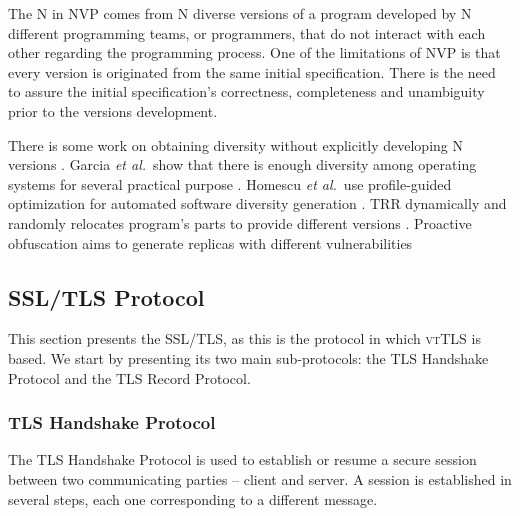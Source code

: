 \documentclass{sig-alternate-05-2015}
\begin{document}
The N in NVP comes from  N diverse versions of a program developed by N different programming teams, or programmers, that do not interact with each other regarding the programming process.
One of the limitations of NVP is that every version is originated from the same initial specification. There is the need to assure the initial specification's correctness, completeness and unambiguity prior to the versions development.

There is some work on obtaining diversity without explicitly  developing N versions \cite{larsen2014sok}. Garcia \emph{et al.}~show that there is enough diversity among operating systems for several practical purpose \cite{Garcia:11}. Homescu \emph{et al.}~use profile-guided optimization for automated software diversity generation \cite{homescu2013profile}. TRR dynamically and randomly relocates program's parts to provide different versions \cite{xu2003transparent}. Proactive obfuscation aims to generate replicas with different vulnerabilities \cite{Roeder:10}



\subsection{SSL/TLS Protocol}


This section presents the SSL/TLS, as this is the protocol in which \textsc{vtTLS} is based. We start by presenting its two main sub-protocols: the TLS Handshake Protocol and the TLS Record Protocol.

\subsubsection{TLS Handshake Protocol}

The TLS Handshake Protocol is used to establish or resume a secure session between two communicating parties -- client and server.
A session is established in several steps, each one corresponding to a different message.
\end{document}
